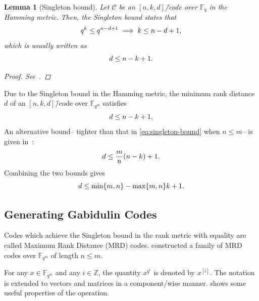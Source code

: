 \documentclass[version=last, paper=A4, parskip=half, oneside,%
toc=bibliography, toc=listof, listof=leveldown]{scrbook}
\theoremstyle{plain}
\newtheorem{lemma}{Lemma}
\theoremstyle{definition}
\theoremstyle{remark}
\newcommand*{\FF}{\ensuremath{\mathbb{F}}}
\newcommand*{\ZZ}{\ensuremath{\mathbb{Z}}}
\begin{document}
\begin{lemma}[Singleton bound]
  Let \(\mathcal{C}\) be an \([n, k, d]\)\=/code over \(\FF_q\) in the Hamming
  metric.  Then, the \emph{Singleton bound} states that
  \[
    q^k \le q^{n - d + 1} \implies k \le n - d + 1\text,
  \]
  which is usually written as
  \[
    d \le n - k + 1\text.
  \]
  \begin{proof}
    See~\cite{Sin64}.
  \end{proof}
\end{lemma}

Due to the Singleton bound in the Hamming metric, the minimum rank distance
\(d\) of an \([n, k, d]\)\=/code over \(\FF_{q^m}\) satisfies
\begin{equation}\label{eq:singleton-bound}
  d \le n - k + 1\text.
\end{equation}
An alternative bound\--- tighter than that in \cref{eq:singleton-bound} when
\(n \le m\)\--- is given in~\cite{Gab85}:
\[
  d \le \frac{m}{n}(n - k) + 1\text.
\]
Combining the two bounds gives
\[
  d \le \min\{m, n\} - \max\{m, n\} k + 1\text.
\]

\subsection{Generating Gabidulin Codes}

Codes which achieve the Singleton bound in the rank metric with equality are
called Maximum Rank Distance (MRD) codes.  \Textcite{Gab85} constructed a family
of MRD codes over \(\FF_{q^m}\) of length \(n \le m\).

For any \(x \in \FF_{q^m}\) and any \(i \in \ZZ\), the quantity \(x^{q^i}\) is
denoted by \(x^{[i]}\).  The notation is extended to vectors and matrices in a
component\-/wise manner.   shows
some useful properties of the operation.
\end{document}
